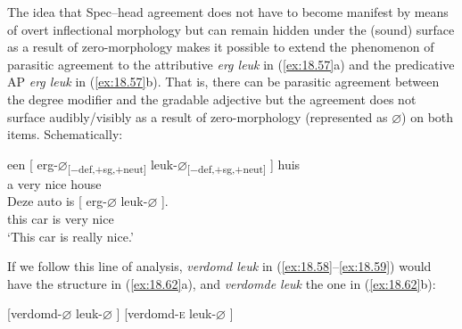 \documentclass[output=paper]{langsci/langscibook}
\begin{document}
The idea that Spec--head agreement does not have to become manifest by means of
overt inflectional morphology but can remain hidden under the (sound) surface
as a result of zero-morphology makes it possible to extend the phenomenon of
parasitic agreement to the attributive \emph{erg leuk} in (\ref{ex:18.57}a) and
the predicative AP \emph{erg leuk} in (\ref{ex:18.57}b). That is, there can be
parasitic agreement between the degree modifier and the gradable adjective but
the agreement does not surface audibly/visibly as a result of zero-morphology
(represented as ${\varnothing}$) on both items. Schematically:

\ea%
    \label{ex:18.61}
	\ea
	\gll een [ erg-${\varnothing}$\textsubscript{[$-$def,$+$sg,$+$neut]} leuk-${\varnothing}$\textsubscript{[$-$def,$+$sg,$+$neut]} ] huis\\
    a   {}     very                        nice                         {}     house\\
	\ex
	\gll Deze  auto    is  [ erg-${\varnothing}$    leuk-${\varnothing}$ ].\\
        this    car      is {} very        nice {}\\
	\glt \enquote*{This car is really nice.}
	\z
\z

If we follow this line of analysis, \emph{verdomd leuk} in
(\ref{ex:18.58}--\ref{ex:18.59}) would have the structure in
(\ref{ex:18.62}a), and \emph{verdomde leuk} the one in (\ref{ex:18.62}b):

\ea%
    \label{ex:18.62}
    \ea {}[verdomd-${\varnothing}$  leuk-${\varnothing}$ ]
	\ex {}[verdomd-\textsc{e}    leuk-${\varnothing}$ ]
	\z
\z
\end{document}
